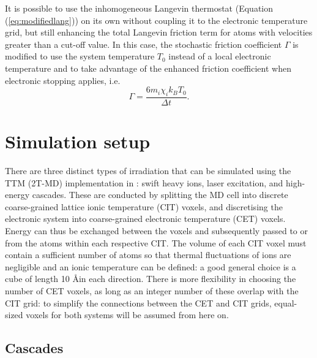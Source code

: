 It is possible to use the inhomogeneous Langevin thermostat (Equation 
(\ref{eq:modifiedlang})) on its own 
without coupling it to the electronic temperature grid, but still enhancing 
the total Langevin friction term for atoms with velocities greater than a 
cut-off value\cite{zarkadoula-13a}. In this case, the stochastic friction 
coefficient $\Gamma$ is modified to use the system temperature $T_0$ 
instead of a local electronic temperature and to take advantage of the 
enhanced friction coefficient when electronic stopping applies, i.e.
\begin{equation}
\Gamma = \frac{6 m_{i} \chi_{i} k_B T_0}{\Delta t}.
\end{equation}

\section{Simulation setup}

There are three distinct types of irradiation that can be simulated using 
the TTM (2T-MD) implementation in \D: swift heavy ions, laser excitation, 
and high-energy cascades. These are conducted by splitting the MD cell 
into discrete coarse-grained lattice ionic temperature (CIT) voxels, and 
discretising the electronic system into coarse-grained electronic 
temperature (CET) voxels. Energy can thus be exchanged between the 
voxels and subsequently passed to or from the atoms within each respective 
CIT. The volume of each CIT voxel must contain a sufficient number of atoms 
so that thermal fluctuations of ions are negligible and an ionic temperature 
can be defined: a good general choice is a cube of length 10 \AA in each 
direction. There is more flexibility in choosing the number of CET voxels, 
as long as an integer number of these overlap with the CIT grid: to simplify 
the connections between the CET and CIT grids, equal-sized voxels for both 
systems will be assumed from here on.

\subsection*{Cascades}

